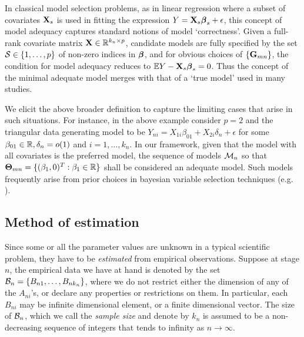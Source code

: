 In classical model selection problems, as in linear regression where a subset of covariates ${\mathbf{X}}_{s}$ is used in fitting the expression $Y = {\mathbf{X}}_{s} {\boldsymbol{\beta}}_{s} + \epsilon$, this concept of model adequacy captures standard notions of model `correctness'. Given a full-rank covariate matrix ${\mathbf{X}} \in {\mathbb{R}}^{k_n \times p}$, candidate models are fully specified by the set ${\cal{S}} \in \{ 1, \ldots, p \}$ of non-zero indices in ${\boldsymbol{\beta}}$, and for obvious choices of $\{ {\mathbf{G}}_{ m n} \}$, the condition for model adequacy reduces to $ {\mathbb{E}} Y - {\mathbf{X}}_s {\boldsymbol{\beta}}_{s} = 0$. Thus the concept of the minimal adequate model merges with that of a `true model' used in many studies.

We elicit the above broader definition to capture the limiting cases that arise in such situations. For instance, in the above example consider $p=2$ and the triangular data generating model to be $Y_{ni} = X_{1i} \beta_{01} + X_{2i} \delta_n + \epsilon$ for some $\beta_{01} \in {\mathbb{R}}, \delta_n = o(1)$ and $i = 1, \ldots, k_n$. In our framework, given that the model with all covariates is the preferred model, the sequence of models ${\cal{M}}_n$ so that ${\boldsymbol{\Theta}}_{m n} = \{ (\beta_1, 0)^T: \beta_1 \in {\mathbb{R}} \}$ shall be considered an adequate model. Such models frequently arise from prior choices in bayesian variable selection techniques (e.g. \cite{NarisettyHe14,RockovaGeorge16}).

\subsection{Method of estimation}
Since some or all the parameter values are unknown in a typical scientific problem, they have to be {\it estimated} from empirical observations. Suppose at stage $n$, the empirical data we have at hand is denoted by the set ${\cal{B}}_n = \{ B_{n1}, \ldots, B_{nk_n} \}$, where we do not restrict either the dimension of any of the $A_{ni}$'s, or declare any properties or restrictions on them. In particular, each $B_{ni}$ may be infinite dimensional element, or a finite dimensional vector. The size of ${\cal{B}}_n$, which we call the {\it sample size} and denote by $k_{n}$ is assumed to be a non-decreasing sequence of integers that tends to infinity as $n \rightarrow \infty$.

